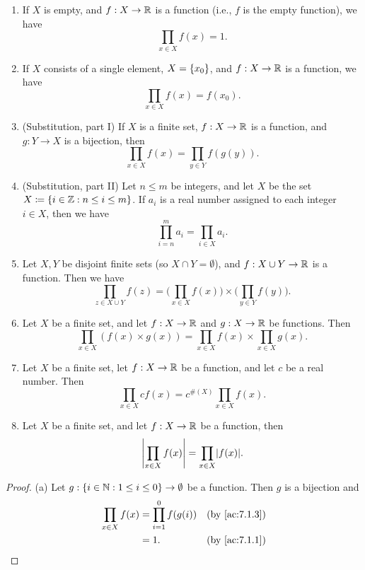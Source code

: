 \begin{ac}\label{ac:7.1.5}
  \begin{enumerate}
    \item If \(X\) is empty, and \(f : X \to \mathbb{R}\) is a function (i.e., \(f\) is the empty function), we have
          \[
            \prod_{x \in X} f(x) = 1.
          \]
    \item If \(X\) consists of a single element, \(X = \left\lbrace x_0\right\rbrace\), and \(f : X \to \mathbb{R}\) is a function, we have
          \[
            \prod_{x \in X} f(x) = f(x_0).
          \]
    \item (Substitution, part I) If \(X\) is a finite set, \(f : X \to \mathbb{R}\) is a function, and \(g : Y \to X\) is a bijection, then
          \[
            \prod_{x \in X} f(x) = \prod_{y \in Y} f(g(y)).
          \]
    \item (Substitution, part II) Let \(n \leq m\) be integers, and let \(X\) be the set \(X \coloneqq \left\lbrace i \in \mathbb{Z} : n \leq i \leq m\right\rbrace\).
          If \(a_i\) is a real number assigned to each integer \(i \in X\), then we have
          \[
            \prod_{i = n}^m a_i = \prod_{i \in X} a_i.
          \]
    \item Let \(X, Y\) be disjoint finite sets (so \(X \cap Y = \emptyset\)), and \(f : X \cup Y \to \mathbb{R}\) is a function.
          Then we have
          \[
            \prod_{z \in X \cup Y} f(z) = \Bigg(\prod_{x \in X} f(x)\Bigg) \times \Bigg(\prod_{y \in Y} f(y)\Bigg).
          \]
    \item Let \(X\) be a finite set, and let \(f : X \to \mathbb{R}\) and \(g : X \to \mathbb{R}\) be functions.
          Then
          \[
            \prod_{x \in X} (f(x) \times g(x)) = \prod_{x \in X} f(x) \times \prod_{x \in X} g(x).
          \]
    \item Let \(X\) be a finite set, let \(f : X \to \mathbb{R}\) be a function, and let \(c\) be a real number.
          Then
          \[
            \prod_{x \in X} cf(x) = c^{\#(X)} \prod_{x \in X} f(x).
          \]
    \item Let \(X\) be a finite set, and let \(f : X \to \mathbb{R}\) be a function, then
          \[
            \abs{\prod_{x \in X} f(x)} = \prod_{x \in X} \abs{f(x)}.
          \]
  \end{enumerate}
\end{ac}

\begin{proof}{(a)}
  Let \(g : \left\lbrace i \in \mathbb{N} : 1 \leq i \leq 0\right\rbrace \to \emptyset\) be a function.
  Then \(g\) is a bijection and
  \begin{align*}
    \prod_{x \in X} f(x) & = \prod_{i = 1}^0 f(g(i)) &  & \by{ac:7.1.3} \\
                         & = 1.                      &  & \by{ac:7.1.1}
  \end{align*}
\end{proof}


